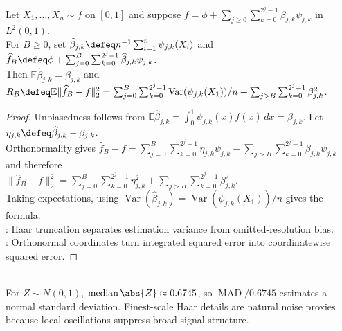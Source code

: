 \begin{proposition} \label{prop:haar-density-exercise-unbiased-risk} \\
Let $X_1,\ldots,X_n\sim f$ on $[0,1]$ and suppose $f=\phi+\sum_{j\geq0}\sum_{k=0}^{2^j-1}\beta_{j,k}\psi_{j,k}$ in $L^2(0,1)$.\\
For $B\geq0$, set $\widehat\beta_{j,k}\defeq n^{-1}\sum_{i=1}^{n}\psi_{j,k}(X_i)$ and $\widehat f_B\defeq\phi+\sum_{j=0}^{B}\sum_{k=0}^{2^j-1}\widehat\beta_{j,k}\psi_{j,k}$.\\
Then $\mathbb{E}\widehat\beta_{j,k}=\beta_{j,k}$ and $R_B\defeq\mathbb{E}\|\widehat f_B-f\|_2^2=\sum_{j=0}^{B}\sum_{k=0}^{2^j-1}\operatorname{Var}(\psi_{j,k}(X_1))/n+\sum_{j>B}\sum_{k=0}^{2^j-1}\beta_{j,k}^2$.
\begin{proof} Unbiasedness follows from $\mathbb{E}\widehat\beta_{j,k}=\int_0^1\psi_{j,k}(x)f(x)\,dx=\beta_{j,k}$. Let $\eta_{j,k}\defeq\widehat\beta_{j,k}-\beta_{j,k}$.\\
Orthonormality gives $\widehat f_B-f=\sum_{j=0}^{B}\sum_{k=0}^{2^j-1}\eta_{j,k}\psi_{j,k}-\sum_{j>B}\sum_{k=0}^{2^j-1}\beta_{j,k}\psi_{j,k}$ and therefore\\
$\|\widehat f_B-f\|_2^2=\sum_{j=0}^{B}\sum_{k=0}^{2^j-1}\eta_{j,k}^2+\sum_{j>B}\sum_{k=0}^{2^j-1}\beta_{j,k}^2$.\\
Taking expectations, using $\operatorname{Var}(\widehat\beta_{j,k})=\operatorname{Var}(\psi_{j,k}(X_1))/n$ gives the formula.\\
: Haar truncation separates estimation variance from omitted-resolution bias.\\
: Orthonormal coordinates turn integrated squared error into coordinatewise squared error.
\end{proof}
\end{proposition}

\begin{remark} \label{rem:wavelet-mad-normalization} \\
For $Z\sim N(0,1)$, $\operatorname{median}\abs{Z}\approx0.6745$, so $\operatorname{MAD}/0.6745$ estimates a normal standard deviation. Finest-scale Haar details are natural noise proxies because local oscillations suppress broad signal structure.
\end{remark}
